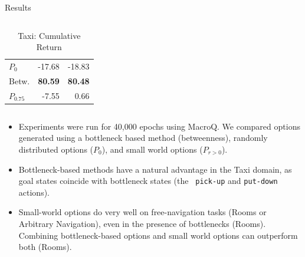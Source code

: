 \begin{block}{Results}
\begin{columns}
\begin{column}{.45\textwidth}
\begin{table}
\begin{tabular}{ l r r }
                $P_0$                   & -17.68         & -18.83           \\ %
                \addlinespace                                                   %
                Betw.                   & {\bf 80.59}   & {\bf 80.48}      \\ %
                \addlinespace                                                   %
                $P_{0.75}$                 & -7.55          & 0.66             \\ %
                \bottomrule
              \end{tabular}
              \caption{Taxi: Cumulative Return}
            \end{table}
        \end{column}
    \end{columns}

    \begin{itemize}
        \item Experiments were run for 40,000 epochs using MacroQ. We compared
            options generated using a bottleneck based method (betweenness),
            randomly distributed options ($P_0$), and small world options ($P_{r
            > 0}$).
        \item Bottleneck-based methods have a natural advantage in the Taxi
            domain, as goal states coincide with bottleneck states (the {\tt
            pick-up} and {\tt put-down} actions). 
        \item Small-world options do very well on free-navigation tasks (Rooms
            or Arbitrary Navigation), even in the presence of bottlenecks
            (Rooms). Combining bottleneck-based options and small world
            options can outperform both (Rooms).
    \end{itemize}
\end{block}

